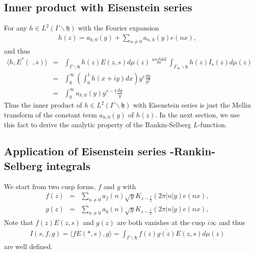 \documentclass[11pt,reqno]{amsart}
\newcommand{\bna}{\begin{eqnarray*}}
\newcommand{\ena}{\end{eqnarray*}}
\newcommand{\mk}{\mathfrak}
\theoremstyle{definition}
\begin{document}
\subsection{Inner product with Eisenstein series}
For any $h\in L^2(\Gamma\backslash\mk h)$ with  the Fourier expansion
\bna
h(z)=a_{h,0}(y)+\sum_{n\neq 0} a_{n,h}(y)e(nx),
\ena
and thus
\bna
\langle h, E^*(\,\,,\overline{s})\rangle&=&
\int_{\Gamma\backslash \mk h}h(z)E(z,s)d\mu(z)
\overset{unfold}{=}\int_{\Gamma_\infty\backslash \mk h}h(z) I_s(z)d\mu(z)\\
&=&\int_0^\infty\left(\int_0^1 h(x+iy)dx\right)  y^s\frac{dy}{y^2}\\
&=&\int_0^\infty a_{h,0}(y)  y^{s-1}\frac{dy}{y}
\ena
Thus the inner product of $h\in L^2(\Gamma\backslash\mk h)$ with Eisenstein series
is just the Mellin transform of the constant term $a_{h,0}(y)$ of $h(z)$.
In the next section, we use this fact to derive the analytic property of the Rankin-Selberg
$L$-function.

\subsection{Application of Eisenstein series -Rankin-Selberg integrals}
We start from two cusp forms, $f$ and $g$ with
\bna
f(z)&=&\sum_{n\neq 0}a_f(n)\sqrt{y}K_{s-\frac{1}{2}}(2\pi|n|y)e(nx),\\
g(z)&=&\sum_{n\neq 0}a_g(n)\sqrt{y}K_{s-\frac{1}{2}}(2\pi|n|y)e(nx),
\ena
Note that $f(z)E(z,s)$ and $g(z)$ are both vanishes at the cusp $i\infty$ and thus
\bna
I(s,f,g)=\langle fE(*,s), g\rangle =\int_{\Gamma\backslash \mk h}f(z)\overline{g(z)}E(z,s)d\mu(z)
\ena
are well defined.
\end{document}
